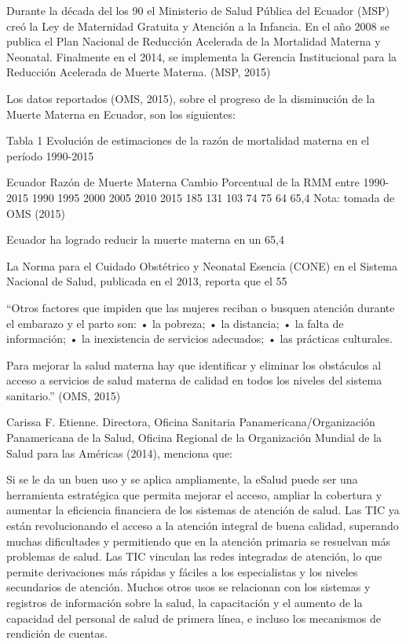\documentclass[12pt]{article}
\begin{document}
Durante la década del los 90 el Ministerio de Salud Pública del Ecuador (MSP) creó la Ley de Maternidad Gratuita y Atención a la Infancia. En el año 2008 se publica el Plan Nacional de Reducción Acelerada de la Mortalidad Materna y Neonatal. Finalmente en el 2014, se implementa la Gerencia Institucional para la Reducción Acelerada de Muerte Materna. (MSP, 2015)

Los datos reportados (OMS, 2015), sobre el progreso de la disminución de la Muerte Materna en Ecuador, son los siguientes:


Tabla 1 Evolución de estimaciones de la razón de mortalidad materna en el período 1990-2015

Ecuador
	Razón de Muerte Materna	Cambio Porcentual de la RMM entre 1990-2015
	1990	1995	2000	2005	2010	2015	
	185	131	103	74	75	64	65,4
Nota: tomada de OMS (2015)

Ecuador ha logrado reducir la muerte materna en un 65,4%

La Norma para el Cuidado Obstétrico y Neonatal Esencia (CONE) en el Sistema Nacional de Salud, publicada en el 2013, reporta que el 55%

“Otros factores que impiden que las mujeres reciban o busquen atención durante el embarazo y el parto son:
•	la pobreza;
•	la distancia;
•	la falta de información;
•	la inexistencia de servicios adecuados;
•	las prácticas culturales.

Para mejorar la salud materna hay que identificar y eliminar los obstáculos al acceso a servicios de salud materna de calidad en todos los niveles del sistema sanitario.” (OMS, 2015)

Carissa F. Etienne. Directora, Oficina Sanitaria Panamericana/Organización Panamericana de la Salud, Oficina Regional de la Organización Mundial de la Salud para las Américas (2014), menciona que:

Si se le da un buen uso y se aplica ampliamente, la eSalud puede ser una herramienta estratégica que permita mejorar el acceso, ampliar la cobertura y aumentar la eficiencia financiera de los sistemas de atención de salud. Las TIC ya están revolucionando el acceso a la atención integral de buena calidad, superando muchas dificultades y permitiendo que en la atención primaria se resuelvan más problemas de salud. Las TIC vinculan las redes integradas de atención, lo que permite derivaciones más rápidas y fáciles a los especialistas y los niveles secundarios de atención. Muchos otros usos se relacionan con los sistemas y registros de información sobre la salud, la capacitación y el aumento de la capacidad del personal de salud de primera línea, e incluso los mecanismos de rendición de cuentas.
\end{document}

